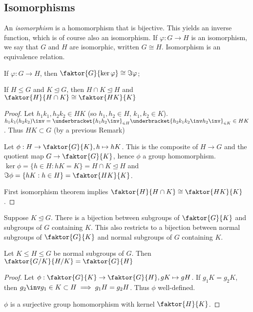 \subsection{Isomorphisms}
An \textit{isomorphism} is a homomorphism that is bijective.
This yields an inverse function, which is of course also an isomorphism.
If $\varphi : G \to H$ is an isomorphism, we say that $G$ and $H$ are isomorphic, written $G \cong H$.
Isomorphism is an equivalence relation.

\begin{theorem}
	If $\varphi : G \to H$, then $\faktor{G}{\ker \varphi} \cong \Im \varphi$;
\end{theorem}

\begin{theorem}
	If $H \leq G$ and $K \trianglelefteq G$, then $H \cap K \trianglelefteq H$ and $\faktor{H}{H \cap K} \cong \faktor{HK}{K}$
\end{theorem}

\begin{proof}
	Let $h_1 k_1, h_2 k_2 \in HK$ (so $h_1, h_2 \in H$, $k_1, k_2 \in K$).
	$h_1 k_1 (h_2 k_2)\inv = \underbracket{h_1 h_2\inv}_{\in H} \underbracket{h_2 k_1 k_2\inv h_2\inv}_{\in K} \in HK$.
	Thus $HK \subset G$ (by a previous Remark)

	Let $\phi : H \to \faktor{G}{K}, h \mapsto hK$.
	This is the composite of $H \to G$ and the quotient map $G \to \faktor{G}{K}$, hence $\phi$ a group homomorphism.
	$\ker \phi = \{h \in H : hK = K\} = H \cap K \trianglelefteq H$ and $\Im \phi = \{hK : h \in H\} = \faktor{HK}{K}$.

	First isomorphism theorem implies $\faktor{H}{H \cap K} \cong \faktor{HK}{K}$.
\end{proof} 

\begin{remark} \label{rem:1.2}
	Suppose $K \trianglelefteq G$.
	There is a bijection between subgroups of $\faktor{G}{K}$ and subgroups of $G$ containing $K$.
	This also restricts to a bijection between normal subgroups of $\faktor{G}{K}$ and normal subgroups of $G$ containing $K$.
\end{remark} 

\begin{theorem}
	Let $K \leq H \leq G$ be normal subgroups of $G$.
	Then $\faktor{G/K}{H/K} = \faktor{G}{H}$
\end{theorem}

\begin{proof}
	Let $\phi : \faktor{G}{K} \to \faktor{G}{H}, gK \mapsto gH$.
	If $g_1 K = g_2 K$, then $g_2\inv g_1 \in K \subset H \implies g_1 H = g_2 H$.
	Thus $\phi$ well-defined.

	$\phi$ is a surjective group homomorphism with kernel $\faktor{H}{K}$.
\end{proof} 